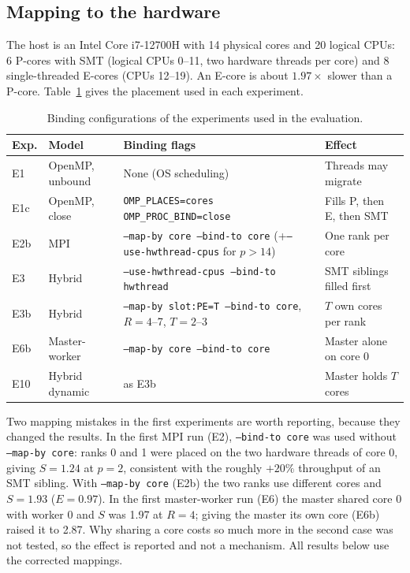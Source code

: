 \documentclass[10pt,a4paper]{article}
\begin{document}
\subsection{Mapping to the hardware}\label{sec:hw}

The host is an Intel Core i7-12700H with 14 physical cores and 20 logical CPUs: 6 P-cores with SMT (logical CPUs 0--11, two hardware threads per core) and 8 single-threaded E-cores (CPUs 12--19). An E-core is about $1.97\times$ slower than a P-core. Table~\ref{tab:binding} gives the placement used in each experiment.

\begin{table}[t]
\centering\small
\begin{tabular}{llp{6.0cm}p{3.9cm}}
\toprule
\textbf{Exp.} & \textbf{Model} & \textbf{Binding flags} & \textbf{Effect} \\
\midrule
E1 & OpenMP, unbound & None (OS scheduling) & Threads may migrate \\
E1c & OpenMP, close & \texttt{OMP\_PLACES=cores OMP\_PROC\_BIND=close} & Fills P, then E, then SMT \\
E2b & MPI & \texttt{--map-by core --bind-to core} (+\texttt{--use-hwthread-cpus} for $p>14$) & One rank per core \\
E3 & Hybrid & \texttt{--use-hwthread-cpus --bind-to hwthread} & SMT siblings filled first \\
E3b & Hybrid & \texttt{--map-by slot:PE=T --bind-to core}, $R=4$--7, $T=2$--3 & $T$ own cores per rank \\
E6b & Master-worker & \texttt{--map-by core --bind-to core} & Master alone on core 0 \\
E10 & Hybrid dynamic & as E3b & Master holds $T$ cores \\
\bottomrule
\end{tabular}
\caption{Binding configurations of the experiments used in the evaluation.}
\label{tab:binding}
\end{table}

Two mapping mistakes in the first experiments are worth reporting, because they changed the results. In the first MPI run (E2), \texttt{--bind-to core} was used without \texttt{--map-by core}: ranks 0 and 1 were placed on the two hardware threads of core 0, giving $S=1.24$ at $p=2$, consistent with the roughly $+20\%$ throughput of an SMT sibling. With \texttt{--map-by core} (E2b) the two ranks use different cores and $S=1.93$ ($E=0.97$). In the first master-worker run (E6) the master shared core 0 with worker 0 and $S$ was 1.97 at $R=4$; giving the master its own core (E6b) raised it to 2.87. Why sharing a core costs so much more in the second case was not tested, so the effect is reported and not a mechanism. All results below use the corrected mappings.
\end{document}
